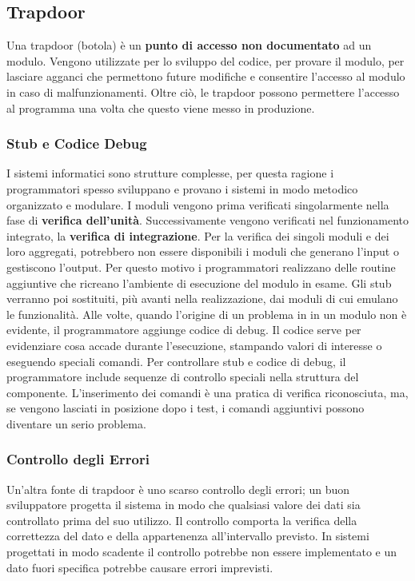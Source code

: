 \subsection{Trapdoor}
Una trapdoor (botola) è un \textbf{punto di accesso non documentato} ad un modulo. Vengono utilizzate per lo sviluppo del codice, per provare il modulo, per lasciare agganci che permettono future modifiche e consentire l'accesso al modulo in caso di malfunzionamenti.
Oltre ciò, le trapdoor possono permettere l'accesso al programma una volta che questo viene messo in produzione.
\subsubsection{Stub e Codice Debug}
I sistemi informatici sono strutture complesse, per questa ragione i programmatori spesso sviluppano e provano i sistemi in modo metodico organizzato e modulare. I moduli vengono prima verificati singolarmente nella fase di \textbf{verifica dell'unità}. Successivamente vengono verificati nel funzionamento integrato, la \textbf{verifica di integrazione}.
Per la verifica dei singoli moduli e dei loro aggregati, potrebbero non essere disponibili i moduli che generano l'input o gestiscono l'output. Per questo motivo i programmatori realizzano delle routine aggiuntive che ricreano l'ambiente di esecuzione del modulo in esame. 
\newline
Gli stub verranno poi sostituiti, più avanti nella realizzazione, dai moduli di cui emulano le funzionalità.
Alle volte, quando l'origine di un problema in in un modulo non è evidente, il programmatore aggiunge codice di debug. Il codice serve per evidenziare cosa accade durante l'esecuzione, stampando valori di interesse o eseguendo speciali comandi.
\newline
Per controllare stub e codice di debug, il programmatore include sequenze di controllo speciali nella struttura del componente. L'inserimento dei comandi è una pratica di verifica riconosciuta, ma, se vengono lasciati in posizione dopo i test, i comandi aggiuntivi possono diventare un serio problema.
\subsubsection{Controllo degli Errori}
Un'altra fonte di trapdoor è uno scarso controllo degli errori; un buon sviluppatore progetta il sistema in modo che qualsiasi valore dei dati sia controllato prima del suo utilizzo. Il controllo comporta la verifica della correttezza del dato e della appartenenza all'intervallo previsto.
In sistemi progettati in modo scadente il controllo potrebbe non essere implementato e un dato fuori specifica potrebbe causare errori imprevisti.
